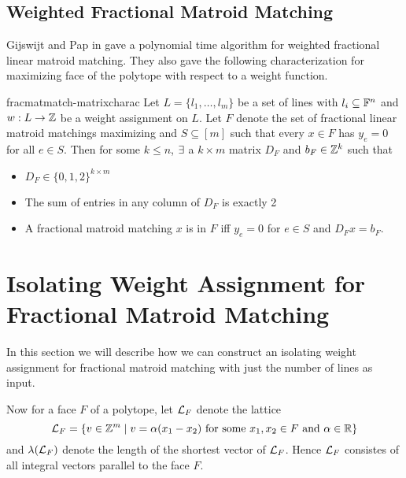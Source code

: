 \subsection{Weighted Fractional Matroid Matching}
Gijswijt and Pap in \cite{GijswijtPap_2013_Aaf} gave a polynomial time algorithm for weighted fractional linear matroid matching. They also gave the following characterization for maximizing face of the polytope with respect to a weight function.
\begin{Theorem}{\cite[Prood of Theorem 1]{GijswijtPap_2013_Aaf}}{fracmatmatch-matrixcharac}
	Let $L=\{l_1,\dots, l_m\}$ be a set of lines with $l_i\subseteq \mathbb{F}^n$ and $w:L\to \mathbb{Z}$ be a weight assignment on $L$. Let $F$ denote the set of fractional linear matroid matchings maximizing and $S\subseteq [m]$ such that every $x\in F$ has $y_e=0$ for all $e\in S$. Then for some $k\leq n$, $\exists$ a $k\times m$ matrix $D_F$ and $b_F\in \mathbb{Z}^k$ such that \begin{itemize}
		\item $D_F\in\{0,1,2\}^{k\times m}$
		\item The sum of entries in any column of $D_F$ is exactly 2
		\item A fractional matroid matching $x$ is in $F$ iff $y_e=0$ for $e\in S$ and $D_Fx=b_F$.
	\end{itemize}
\end{Theorem}
\section{Isolating Weight Assignment for Fractional Matroid Matching}
In this section we will describe how we can construct an isolating weight assignment for fractional matroid matching with just the number of lines as input.

Now for a face $F$ of a polytope, let $\mathcal{L}_F$ denote the lattice $$\mathcal{L}_F=\{v\in\mathbb{Z}^{m}\mid v=\alpha(x_1-x_2)\text{  for some $x_1,x_2\in F$ and $\alpha\in\mathbb{R}$}\}$$and $\lambda(\mathcal{L}_F)$ denote the length of the shortest vector of $\mathcal{L}_F$. Hence $\mathcal{L}_F$ consistes of all integral vectors parallel to the face $F$.

